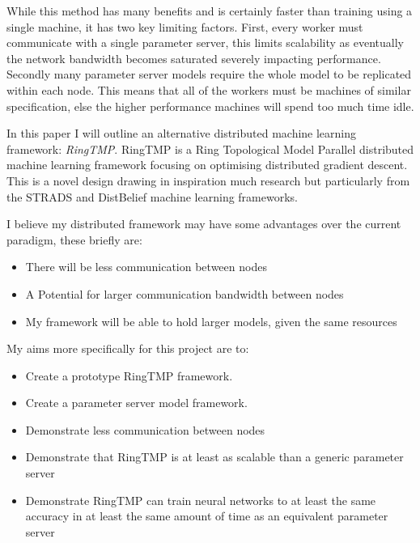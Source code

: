 While this method has many benefits and is certainly faster than training using
a single machine, it has two key limiting factors. First, every worker must
communicate with a single parameter server, this limits scalability as
eventually the network bandwidth becomes saturated severely impacting
performance. \cite{LI2014ParameterServers} Secondly many parameter server models
require the whole model to be replicated within each node.
\cite{jia2018BeyondData} This means that all of the workers must be machines of
similar specification, else the higher performance machines will spend too much
time idle.
\par
In this paper I will outline an alternative distributed machine learning
framework: \textit{RingTMP}. RingTMP is a Ring Topological Model Parallel
distributed machine learning framework focusing on optimising distributed
gradient descent. This is a novel design drawing in inspiration much research
but particularly from the STRADS and DistBelief machine learning frameworks.
\cite{kim2016STRADS,Dean2012Distbelief}
\par
I believe my distributed framework may have some advantages over the current
paradigm, these briefly are:
\begin{itemize}
    \item There will be less communication between nodes
    \item A Potential for larger communication bandwidth between nodes
    \item My framework will be able to hold larger models, given the same resources
\end{itemize}

My aims more specifically for this project are to:
\begin{itemize}
    \item Create a prototype RingTMP framework.
    \item Create a parameter server model framework.
    \item Demonstrate less communication between nodes
    \item Demonstrate that RingTMP is at least as scalable than a generic parameter
    server
    \item Demonstrate RingTMP can train neural networks to at least the same
    accuracy in at least the same amount of time as an equivalent parameter server
\end{itemize}

